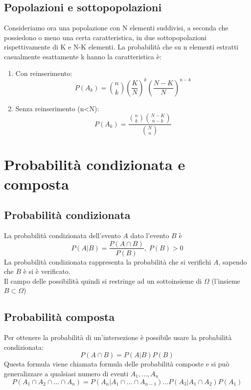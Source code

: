 \documentclass{article}
\begin{document}
\subsection{Popolazioni e sottopopolazioni}
Consideriamo ora una popolazione con N elementi suddivisi, a seconda che possiedono o meno una certa caratteristica, in due sottopopolazioni rispettivamente di K e N-K elementi.
La probabilità che su n elementi estratti casualmente esattamente k hanno la caratteristica è:
\begin{enumerate}
\item Con reinserimento:
\begin{equation}
P(A_k) = {{n}\choose{k}}(\frac{K}{N})^{k}(\frac{N-K}{N})^{n-k}
\end{equation}
\item Senza reinserimento (n<N):
\begin{equation}
P(A_k) = \frac{{{n}\choose{k}}{{N-K}\choose{n-k}}}{{{N}\choose{n}}}
\end{equation}
\end{enumerate}
\newpage
\section{Probabilità condizionata e composta}
\subsection{Probabilità condizionata}
La probabilità condizionata dell'evento $A$ dato l'evento $B$ è
\begin{equation}
P(A|B) = \frac{P({A}\cap{B})}{P(B)},\; P(B)>0
\end{equation}
La probabilità condizionata rappresenta la probabilità che si verifichi $A$, sapendo che $B$ è si è verificato.\\
Il campo delle possibilità quindi si restringe ad un sottoinsieme di $\Omega$ (l'insieme ${B}\subset{\Omega}$)
\subsection{Probabilità composta}
Per ottenere la probabilità di un'intersezione è possibile usare la probabilità condizionata:
\begin{equation}
  P({A}\cap{B}) = P(A|B)P(B)
\end{equation}
Questa formula viene chiamata formula delle probabilità composte e si può generalizzare a qualsiasi numero di eventi $A_1,...,A_n$
\begin{equation}
  P({A_1}\cap{A_2}\cap{...}\cap{A_n}) = P(A_n|{A_1}\cap{...}\cap{A_{n-1}})...P(A_3|{A_1}\cap{A_2})P(A_1)
\end{equation}
\end{document}
